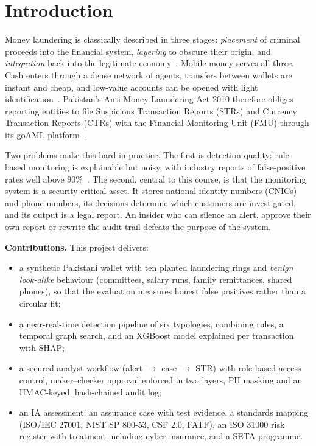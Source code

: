 \documentclass[conference,10pt]{IEEEtran}
\begin{document}
\section{Introduction}

Money laundering is classically described in three stages: \emph{placement} of criminal proceeds
into the financial system, \emph{layering} to obscure their origin, and \emph{integration} back into
the legitimate economy~\cite{fatf2012rec}. Mobile money serves all three. Cash enters through a
dense network of agents, transfers between wallets are instant and cheap, and low-value accounts can
be opened with light identification~\cite{fatf2013npps,gsma2015proportional}. Pakistan's
Anti-Money Laundering Act 2010 therefore obliges reporting entities to file Suspicious Transaction
Reports (STRs) and Currency Transaction Reports (CTRs) with the Financial Monitoring Unit (FMU)
through its goAML platform~\cite{amla2010,fmu2021ctr,nibaf2026goaml}.

Two problems make this hard in practice. The first is detection quality: rule-based monitoring is
explainable but noisy, with industry reports of false-positive rates well above
90\%~\cite{deloitte2020tm}. The second, central to this course, is that the monitoring system is a
security-critical asset. It stores national identity numbers (CNICs) and phone numbers, its
decisions determine which customers are investigated, and its output is a legal report. An insider
who can silence an alert, approve their own report or rewrite the audit trail defeats the purpose
of the system.

\textbf{Contributions.} This project delivers:
\begin{itemize}
  \item a synthetic Pakistani wallet with ten planted laundering rings and \emph{benign look-alike}
        behaviour (committees, salary runs, family remittances, shared phones), so that the
        evaluation measures honest false positives rather than a circular fit;
  \item a near-real-time detection pipeline of six typologies, combining rules, a temporal graph
        search, and an XGBoost model explained per transaction with SHAP;
  \item a secured analyst workflow (alert $\rightarrow$ case $\rightarrow$ STR) with role-based
        access control, maker--checker approval enforced in two layers, PII masking and an
        HMAC-keyed, hash-chained audit log;
  \item an IA assessment: an assurance case with test evidence, a standards mapping (ISO/IEC 27001,
        NIST SP 800-53, CSF 2.0, FATF), an ISO 31000 risk register with treatment including cyber
        insurance, and a SETA programme.
\end{itemize}
\end{document}

